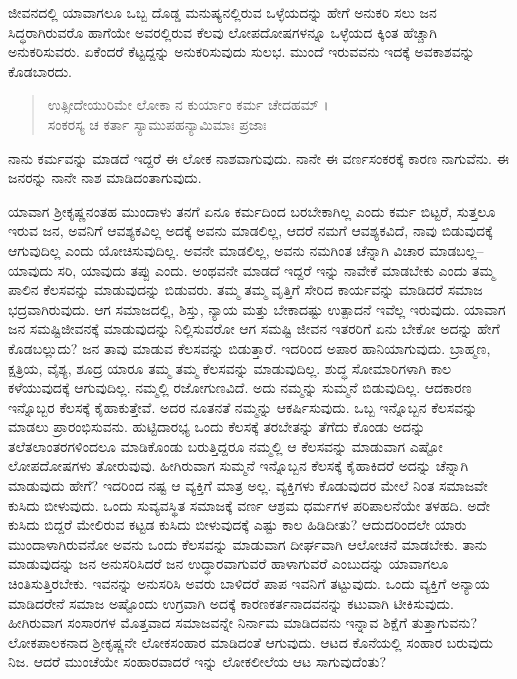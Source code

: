 ಜೀವನದಲ್ಲಿ ಯಾವಾಗಲೂ ಒಬ್ಬ ದೊಡ್ಡ ಮನುಷ್ಯನಲ್ಲಿರುವ ಒಳ್ಳೆಯದನ್ನು ಹೇಗೆ ಅನುಕರಿ ಸಲು ಜನ ಸಿದ್ಧರಾಗಿರುವರೊ ಹಾಗೆಯೇ ಅವರಲ್ಲಿರುವ ಕೆಲವು ಲೋಪದೋಷಗಳನ್ನೂ ಒಳ್ಳೆಯದ ಕ್ಕಿಂತ ಹೆಚ್ಚಾಗಿ ಅನುಕರಿಸುವರು. ಏಕೆಂದರೆ ಕೆಟ್ಟದ್ದನ್ನು ಅನುಕರಿಸುವುದು ಸುಲಭ. ಮುಂದೆ ಇರುವವನು ಇದಕ್ಕೆ ಅವಕಾಶವನ್ನು ಕೊಡಬಾರದು.

\begin{verse}
ಉತ್ಸೀದೇಯುರಿಮೇ ಲೋಕಾ ನ ಕುರ್ಯಾಂ ಕರ್ಮ ಚೇದಹಮ್ ।\\ಸಂಕರಸ್ಯ ಚ ಕರ್ತಾ ಸ್ಯಾಮುಪಹನ್ಯಾಮಿಮಾಃ ಪ್ರಜಾಃ 
\end{verse}

{\small ನಾನು ಕರ್ಮವನ್ನು ಮಾಡದೆ ಇದ್ದರೆ ಈ ಲೋಕ ನಾಶವಾಗುವುದು. ನಾನೇ ಈ ವರ್ಣಸಂಕರಕ್ಕೆ ಕಾರಣ ನಾಗುವೆನು. ಈ ಜನರನ್ನು ನಾನೇ ನಾಶ ಮಾಡಿದಂತಾಗುವುದು.}

ಯಾವಾಗ ಶ್ರೀಕೃಷ್ಣನಂತಹ ಮುಂದಾಳು ತನಗೆ ಏನೂ ಕರ್ಮದಿಂದ ಬರಬೇಕಾಗಿಲ್ಲ ಎಂದು ಕರ್ಮ ಬಿಟ್ಟರೆ, ಸುತ್ತಲೂ ಇರುವ ಜನ, ಅವನಿಗೆ ಆವಶ್ಯಕವಿಲ್ಲ ಅದಕ್ಕೆ ಅವನು ಮಾಡಲಿಲ್ಲ, ಆದರೆ ನಮಗೆ ಆವಶ್ಯಕವಿದೆ, ನಾವು ಬಿಡುವುದಕ್ಕೆ ಆಗುವುದಿಲ್ಲ ಎಂದು ಯೋಚಿಸುವುದಿಲ್ಲ. ಅವನೇ ಮಾಡಲಿಲ್ಲ, ಅವನು ನಮಗಿಂತ ಚೆನ್ನಾಗಿ ವಿಚಾರ ಮಾಡಬಲ್ಲ–ಯಾವುದು ಸರಿ, ಯಾವುದು ತಪ್ಪು ಎಂದು. ಅಂಥವನೇ ಮಾಡದೆ ಇದ್ದರೆ ಇನ್ನು ನಾವೇಕೆ ಮಾಡಬೇಕು ಎಂದು ತಮ್ಮ ಪಾಲಿನ ಕೆಲಸವನ್ನು ಮಾಡುವುದನ್ನು ಬಿಡುವರು. ತಮ್ಮ ತಮ್ಮ ವೃತ್ತಿಗೆ ಸೇರಿದ ಕಾರ್ಯವನ್ನು ಮಾಡಿದರೆ ಸಮಾಜ ಭದ್ರವಾಗಿರುವುದು. ಆಗ ಸಮಾಜದಲ್ಲಿ, ಶಿಸ್ತು, ನ್ಯಾಯ ಮತ್ತು ಬೇಕಾದಷ್ಟು ಉತ್ಪಾದನೆ ಇವೆಲ್ಲ ಇರುವುದು. ಯಾವಾಗ ಜನ ಸಮಷ್ಟಿಜೀವನಕ್ಕೆ ಮಾಡುವುದನ್ನು ನಿಲ್ಲಿಸುವರೋ ಆಗ ಸಮಷ್ಟಿ ಜೀವನ ಇತರರಿಗೆ ಏನು ಬೇಕೋ ಅದನ್ನು ಹೇಗೆ ಕೊಡಬಲ್ಲುದು? ಜನ ತಾವು ಮಾಡುವ ಕೆಲಸವನ್ನು ಬಿಡುತ್ತಾರೆ. ಇದರಿಂದ ಅಪಾರ ಹಾನಿಯಾಗುವುದು. ಬ್ರಾಹ್ಮಣ, ಕ್ಷತ್ರಿಯ, ವೈಶ್ಯ, ಶೂದ್ರ ಯಾರೂ ತಮ್ಮ ತಮ್ಮ ಕೆಲಸವನ್ನು ಮಾಡುವುದಿಲ್ಲ. ಶುದ್ಧ ಸೋಮಾರಿಗಳಾಗಿ ಕಾಲ ಕಳೆಯುವುದಕ್ಕೆ ಆಗುವುದಿಲ್ಲ. ನಮ್ಮಲ್ಲಿ ರಜೋಗುಣವಿದೆ. ಅದು ನಮ್ಮನ್ನು ಸುಮ್ಮನೆ ಬಿಡುವುದಿಲ್ಲ. ಆದಕಾರಣ ಇನ್ನೊಬ್ಬರ ಕೆಲಸಕ್ಕೆ ಕೈಹಾಕುತ್ತೇವೆ. ಅದರ ನೂತನತೆ ನಮ್ಮನ್ನು ಆಕರ್ಷಿಸುವುದು. ಒಬ್ಬ ಇನ್ನೊಬ್ಬನ ಕೆಲಸವನ್ನು ಮಾಡಲು ಪ್ರಾರಂಭಿಸುವನು. ಹುಟ್ಟಿದಾರಭ್ಯ ಒಂದು ಕೆಲಸಕ್ಕೆ ತರಬೇತನ್ನು ತೆಗೆದು ಕೊಂಡು ಅದನ್ನು ತಲೆತಲಾಂತರಗಳಿಂದಲೂ ಮಾಡಿಕೊಂಡು ಬರುತ್ತಿದ್ದರೂ ನಮ್ಮಲ್ಲಿ ಆ ಕೆಲಸವನ್ನು ಮಾಡುವಾಗ ಎಷ್ಟೋ ಲೋಪದೋಷಗಳು ತೋರುವುವು. ಹೀಗಿರುವಾಗ ಸುಮ್ಮನೆ ಇನ್ನೊಬ್ಬನ ಕೆಲಸಕ್ಕೆ ಕೈಹಾಕಿದರೆ ಅದನ್ನು ಚೆನ್ನಾಗಿ ಮಾಡುವುದು ಹೇಗೆ? ಇದರಿಂದ ನಷ್ಟ ಆ ವ್ಯಕ್ತಿಗೆ ಮಾತ್ರ ಅಲ್ಲ. ವ್ಯಕ್ತಿಗಳು ಕೊಡುವುದರ ಮೇಲೆ ನಿಂತ ಸಮಾಜವೇ ಕುಸಿದು ಬೀಳುವುದು. ಒಂದು ಸುವ್ಯವಸ್ಥಿತ ಸಮಾಜಕ್ಕೆ ವರ್ಣ ಆಶ್ರಮ ಧರ್ಮಗಳ ಪರಿಪಾಲನೆಯೇ ತಳಹದಿ. ಅದೇ ಕುಸಿದು ಬಿದ್ದರೆ ಮೇಲಿರುವ ಕಟ್ಟಡ ಕುಸಿದು ಬೀಳುವುದಕ್ಕೆ ಎಷ್ಟು ಕಾಲ ಹಿಡಿದೀತು? ಆದುದರಿಂದಲೇ ಯಾರು ಮುಂದಾಳಾಗಿರುವನೋ ಅವನು ಒಂದು ಕೆಲಸವನ್ನು ಮಾಡುವಾಗ ದೀರ್ಘವಾಗಿ ಆಲೋಚನೆ ಮಾಡಬೇಕು. ತಾನು ಮಾಡುವುದನ್ನು ಜನ ಅನುಸರಿಸಿದರೆ ಜನ ಉದ್ಧಾರವಾಗುವರೆ ಹಾಳಾಗುವರೆ ಎಂಬುದನ್ನು ಯಾವಾಗಲೂ ಚಿಂತಿಸುತ್ತಿರಬೇಕು. ಇವನನ್ನು ಅನುಸರಿಸಿ ಅವರು ಬಾಳಿದರೆ ಪಾಪ ಇವನಿಗೆ ತಟ್ಟುವುದು. ಒಂದು ವ್ಯಕ್ತಿಗೆ ಅನ್ಯಾಯ ಮಾಡಿದರೇನೆ ಸಮಾಜ ಅಷ್ಟೊಂದು ಉಗ್ರವಾಗಿ ಅದಕ್ಕೆ ಕಾರಣಕರ್ತನಾದವನನ್ನು ಕಟುವಾಗಿ ಟೀಕಿಸುವುದು. ಹೀಗಿರುವಾಗ ಸಂಸಾರಗಳ ಮೊತ್ತವಾದ ಸಮಾಜವನ್ನೇ ನಿರ್ನಾಮ ಮಾಡಿದವನು ಇನ್ನಾವ ಶಿಕ್ಷೆಗೆ ತುತ್ತಾಗುವನು? ಲೋಕಪಾಲಕನಾದ ಶ್ರೀಕೃಷ್ಣನೇ ಲೋಕಸಂಹಾರ ಮಾಡಿದಂತೆ ಆಗುವುದು. ಆಟದ ಕೊನೆಯಲ್ಲಿ ಸಂಹಾರ ಬರುವುದು ನಿಜ. ಆದರೆ ಮುಂಚೆಯೇ ಸಂಹಾರವಾದರೆ ಇನ್ನು ಲೋಕಲೀಲೆಯ ಆಟ ಸಾಗುವುದೆಂತು?

